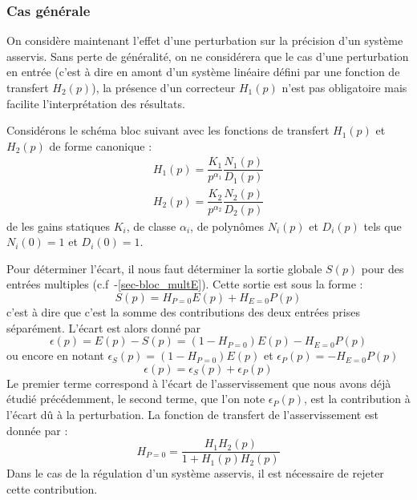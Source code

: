 \subsubsection{Cas générale}
On considère maintenant l'effet d'une perturbation sur la précision d'un 
système asservis.
Sans perte de généralité, on ne considérera que le cas d'une perturbation 
en entrée (c'est à dire en amont d'un système linéaire défini par une fonction 
de transfert $H_2(p)$), la présence d'un correcteur $H_1(p)$ n'est pas 
obligatoire mais facilite l'interprétation des résultats.

Considérons le schéma bloc suivant avec les fonctions de transfert $H_1(p)$ 
et $H_2(p)$ de forme canonique :
\begin{align*}
    H_1(p)=\dfrac{K_1}{p^{\alpha_1}}\dfrac{N_1(p)}{D_1(p)} \\
    H_2(p)=\dfrac{K_2}{p^{\alpha_2}}\dfrac{N_2(p)}{D_2(p)}
\end{align*}
de les gains statiques $K_i$, de classe $\alpha_i$, de polynômes $N_i(p)$
et $D_i(p)$ tels que $N_i(0)=1$ et $D_i(0)=1$.
\begin{center}
    
\end{center}
Pour déterminer l'écart, il nous faut déterminer la sortie globale $S(p)$ pour
des entrées multiples (c.f~-\cref{sec-bloc_multE}).
Cette sortie est sous la forme :
\[
S(p)=H_{P=0}E(p)+H_{E=0}P(p)
\]
c'est à dire que c'est la somme des contributions des deux entrées prises
séparément.
L'écart est alors donné par 
\[
\epsilon(p)=E(p)-S(p)=\left(1-H_{P=0}\right)E(p)-H_{E=0}P(p)
\]
ou encore en notant $\epsilon_S(p)=\left(1-H_{P=0}\right)E(p)$ et 
$\epsilon_P(p)=-H_{E=0}P(p)$
\[
    \epsilon(p)=\epsilon_S(p) + \epsilon_P(p)
\]
Le premier terme correspond à l'écart de l'asservissement que nous avons 
déjà étudié précédemment, le second terme, que l'on 
note $\epsilon_P(p)$, est la contribution à l'écart dû à la perturbation.
La fonction de transfert de l'asservissement est donnée par :
\[
H_{P=0}=\dfrac{H_1H_2(p)}{1+H_1(p)H_2(p)} 
\]
Dans le cas de la régulation d'un système asservis, il est nécessaire de 
rejeter cette contribution.

